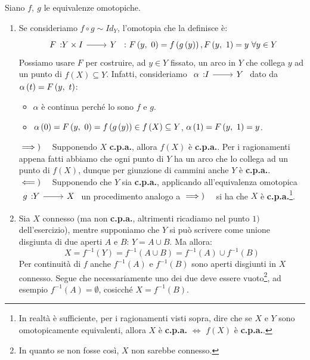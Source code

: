 \begin{demonstration} Siano $f,\ g$ le equivalenze omotopiche.
	\begin{center}
	\end{center}
	\begin{enumerate}[label=\Roman*]
		\item Se consideriamo $f\circ g\sim Id_Y$, l'omotopia che la definisce è:
		\begin{equation*}
			\funz{F}{Y\times I}{Y}\ \colon \mvf{F}{y}{0}=f\left(g\left(y\right)\right), \mvf{F}{y}{1}=y\ \forall y\in Y
		\end{equation*}
		Possiamo usare $F$ per costruire, ad $y\in Y$ fissato, un arco in $Y$ che collega $y$ ad un punto di $f\left(X\right)\subseteq Y$. Infatti, consideriamo $\funz{\alpha}{I}{Y}$ dato da $\alpha\left(t\right)=F\left(y,\ t\right)$:
\begin{itemize}
\item $\alpha$ è continua perché lo sono $f$ e $g$.
\item $\alpha\left(0\right)=F\left(y,\ 0\right)=f\left(g\left(y\right)\right)\in f\left(X\right)\subseteq Y$, $\alpha\left(1\right)=F\left(y,\ 1\right)=y$.
\end{itemize}
$\implies)\quad$ Supponendo $X$ \textbf{c.p.a.}, allora $f\left(X\right)$ è \textbf{c.p.a.}. Per i ragionamenti appena fatti abbiamo che ogni punto di $Y$ ha un arco che lo collega ad un punto di $f\left(X\right)$, dunque per giunzione di cammini anche $Y$ è \textbf{c.p.a.}.\\
$\impliedby)\quad$ Supponendo che $Y$ sia \textbf{c.p.a.}, applicando all'equivalenza omotopica $\funz{g}{Y}{X}$ un procedimento analogo a $\implies)\quad$ si ha che $X$ è \textbf{c.p.a.}\footnote{In realtà è sufficiente, per i ragionamenti visti sopra, dire che se $X$ e $Y$ sono omotopicamente equivalenti, allora $X$ è \textbf{c.p.a.} $\iff$ $f\left(X\right)$ è \textbf{c.p.a.}.}.
\item Sia $X$ connesso (ma non \textbf{c.p.a.}, altrimenti ricadiamo nel punto $1)$ dell'esercizio), mentre supponiamo che $Y$ si può scrivere come unione disgiunta di due aperti $A$ e $B$: $Y=A\cup B$.
Ma allora:
\begin{equation*}
	X=f^{-1}\left(Y\right)=f^{-1}\left(A\cup B\right)=f^{-1}\left(A\right)\cup f^{-1}\left(B\right)
\end{equation*}
Per continuità di $f$ anche $f^{-1}\left(A\right)$ e $f^{-1}\left(B\right)$ sono aperti disgiunti in $X$ connesso. Segue che necessariamente uno dei due deve essere vuoto\footnote{In quanto se non fosse così, $X$ non sarebbe connesso.}, ad esempio $f^{-1}\left(A\right)=\emptyset$, cosicché $X=f^{-1}\left(B\right)$. \\

\end{enumerate}
\end{demonstration}
